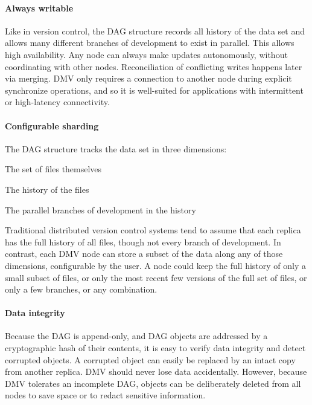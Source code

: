 \paragraph{Always writable}

Like in version control, the DAG structure records all history of the data set
and allows many different branches of development to exist in parallel. This
allows high availability. Any node can always make updates autonomously, without
coordinating with other nodes. Reconciliation of conflicting writes happens
later via merging. DMV only requires a connection to another node during
explicit synchronize operations, and so it is well-suited for applications with
intermittent or high-latency connectivity.


\paragraph{Configurable sharding}

The DAG structure tracks the data set in three dimensions:

\begin{tight_enumerate}
    \item The set of files themselves
    \item The history of the files
    \item The parallel branches of development in the history
\end{tight_enumerate}

Traditional distributed version control systems tend to assume that each replica
has the full history of all files, though not every branch of development. In
contrast, each DMV node can store a subset of the data along any of those
dimensions, configurable by the user. A node could keep the full history of only
a small subset of files, or only the most recent few versions of the full set of
files, or only a few branches, or any combination.



\paragraph{Data integrity}

Because the DAG is append-only, and DAG objects are addressed by a cryptographic
hash of their contents, it is easy to verify data integrity and detect corrupted
objects. A corrupted object can easily be replaced by an intact copy from
another replica. DMV should never lose data accidentally. However, because DMV
tolerates an incomplete DAG, objects can be deliberately deleted from all nodes
to save space or to redact sensitive information.


